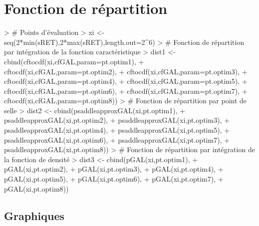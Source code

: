 \documentclass{report}
\begin{document}
\section{Fonction de répartition}
\begin{Schunk}
\begin{Sinput}
> # Points d'évaluation
> xi <- seq(2*min(sRET),2*max(sRET),length.out=2^6)
> # Fonction de répartition par intégration de la fonction caractéristique
> dist1 <- cbind(cftocdf(xi,cfGAL,param=pt.optim1),
+ 		cftocdf(xi,cfGAL,param=pt.optim2),
+ 		cftocdf(xi,cfGAL,param=pt.optim3),
+ 		cftocdf(xi,cfGAL,param=pt.optim4),
+ 		cftocdf(xi,cfGAL,param=pt.optim5),
+ 		cftocdf(xi,cfGAL,param=pt.optim6),
+ 		cftocdf(xi,cfGAL,param=pt.optim7),
+ 		cftocdf(xi,cfGAL,param=pt.optim8))
> # Fonction de répartition par point de selle
> dist2 <- cbind(psaddleapproxGAL(xi,pt.optim1),
+ 		psaddleapproxGAL(xi,pt.optim2),
+ 		psaddleapproxGAL(xi,pt.optim3),
+ 		psaddleapproxGAL(xi,pt.optim4),
+ 		psaddleapproxGAL(xi,pt.optim5),
+ 		psaddleapproxGAL(xi,pt.optim6),
+ 		psaddleapproxGAL(xi,pt.optim7),
+ 		psaddleapproxGAL(xi,pt.optim8))
> # Fonction de répartition par intégration de la fonction de densité
> dist3 <- cbind(pGAL(xi,pt.optim1),
+ 		pGAL(xi,pt.optim2),
+ 		pGAL(xi,pt.optim3),
+ 		pGAL(xi,pt.optim4),
+ 		pGAL(xi,pt.optim5),
+ 		pGAL(xi,pt.optim6),
+ 		pGAL(xi,pt.optim7),
+ 		pGAL(xi,pt.optim8))
\end{Sinput}
\end{Schunk}
\pagebreak
\subsection{Graphiques}
\end{document}
